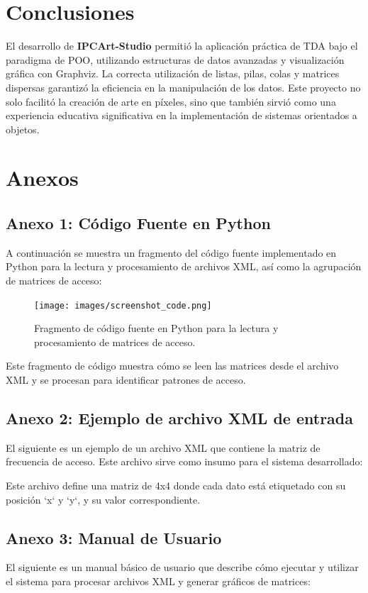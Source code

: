 \documentclass[letterpaper,12pt]{article}
\begin{document}
\begin{multicols}{2}
    \section*{Conclusiones}
    El desarrollo de \textbf{IPCArt-Studio} permiti\'o la aplicaci\'on pr\'actica de TDA bajo el paradigma de POO, utilizando estructuras de datos avanzadas y visualizaci\'on gr\'afica con Graphviz. La correcta utilizaci\'on de listas, pilas, colas y matrices dispersas garantiz\'o la eficiencia en la manipulaci\'on de los datos. Este proyecto no solo facilit\'o la creaci\'on de arte en p\'ixeles, sino que tambi\'en sirvi\'o como una experiencia educativa significativa en la implementaci\'on de sistemas orientados a objetos.
    \newpage
    \section*{Anexos}

    \subsection*{Anexo 1: Código Fuente en Python}
    A continuación se muestra un fragmento del código fuente implementado en Python para la lectura y procesamiento de archivos XML, así como la agrupación de matrices de acceso:

    \begin{figure}
        \centering
        \texttt{[image: images/screenshot\_code.png]}
        \caption{Fragmento de código fuente en Python para la lectura y procesamiento de matrices de acceso.}
    \end{figure}

    Este fragmento de código muestra cómo se leen las matrices desde el archivo XML y se procesan para identificar patrones de acceso.

    \subsection*{Anexo 2: Ejemplo de archivo XML de entrada}
    El siguiente es un ejemplo de un archivo XML que contiene la matriz de frecuencia de acceso. Este archivo sirve como insumo para el sistema desarrollado:



    Este archivo define una matriz de 4x4 donde cada dato está etiquetado con su posición `x` y `y`, y su valor correspondiente.


    \subsection*{Anexo 3: Manual de Usuario}
    El siguiente es un manual básico de usuario que describe cómo ejecutar y utilizar el sistema para procesar archivos XML y generar gráficos de matrices:


\end{multicols}
\end{document}

